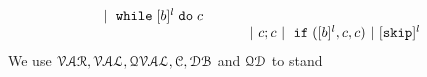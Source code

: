 \[\begin{array}{llll}
~|~ {\ewhile [ \bexpr ]^{l} \edo {c} }
 \\
 &&&
~|~ {c};{c}  
~|~ \eif([\bexpr]{}^l , {c}, {c}) 
~|~ [\eskip]^l 
%
%
\end{array}
\]
We use
$\mathcal{VAR}, \mathcal{VAL}, \mathcal{QVAL}, \mathcal{C}, \mathcal{DB}$ and $\mathcal{QD}$ to stand

